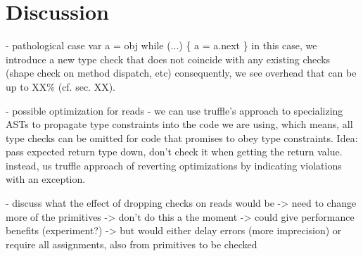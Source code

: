 
\section{Discussion}
\label{sec:discussion}


\begin{cnote}
- pathological case
  var a = obj
  while (...) \{
    a = a.next
  \}
  in this case, we introduce a new type check that does not coincide with any
  existing checks (shape check on method dispatch, etc)
  consequently, we see overhead that can be up to XX\% (cf. sec. XX).


- possible optimization for reads
  - we can use truffle's approach to specializing ASTs to propagate
    type constraints into the code we are using, which means,
    all type checks can be omitted for code that promises to obey
    type constraints.
    Idea: pass expected return type down, don't check it when getting
     the return value. instead, us truffle approach of reverting optimizations
     by indicating violations with an exception.
 
 
 - discuss what the effect of dropping checks on reads would be
   -> need to change more of the primitives
   -> don't do this a the moment
   -> could give performance benefits (experiment?)
   -> but would either delay errors (more imprecision)
      or require all assignments, also from primitives to be checked
\end{cnote}

